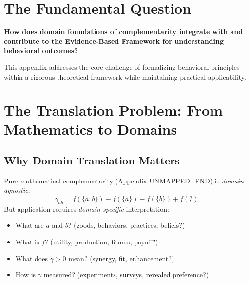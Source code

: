 \section{The Fundamental Question}
\label{sec:dfn-fundamental}

\begin{tcolorbox}[
    colback=red!5!white,
    colframe=red!75!black,
    title={\textbf{Fundamental Question}}
]
\textbf{How does domain foundations of complementarity integrate with and contribute to the
Evidence-Based Framework for understanding behavioral outcomes?}

This appendix addresses the core challenge of formalizing behavioral principles
within a rigorous theoretical framework while maintaining practical applicability.
\end{tcolorbox}


\section{The Translation Problem: From Mathematics to Domains}
\label{sec:translation}

\subsection{Why Domain Translation Matters}

\begin{tcolorbox}[colback=yellow!5!white,colframe=yellow!75!black,title=\textbf{The Central Challenge}]
Pure mathematical complementarity (Appendix UNMAPPED_FND) is \textit{domain-agnostic}:
\begin{equation}
\gamma_{ab} = f(\{a,b\}) - f(\{a\}) - f(\{b\}) + f(\emptyset)
\end{equation}
But application requires \textit{domain-specific} interpretation:
\begin{itemize}[noitemsep]
    \item What are $a$ and $b$? (goods, behaviors, practices, beliefs?)
    \item What is $f$? (utility, production, fitness, payoff?)
    \item What does $\gamma > 0$ mean? (synergy, fit, enhancement?)
    \item How is $\gamma$ measured? (experiments, surveys, revealed preference?)
\end{itemize}
\end{tcolorbox}

